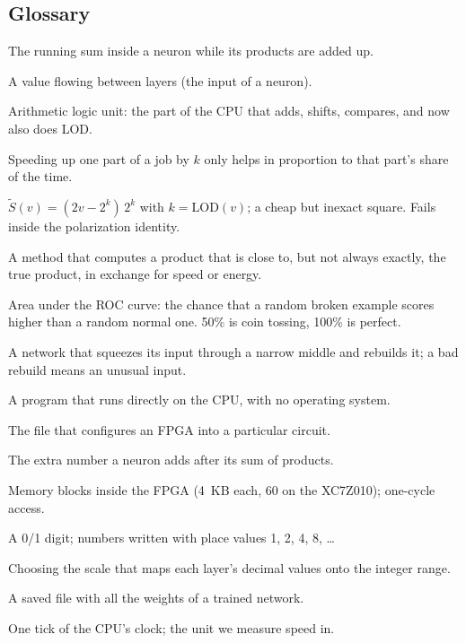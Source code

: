 \subsection{Glossary}

\begin{description}[style=nextline,leftmargin=1.2cm,font=\normalfont\bfseries]
  \item[Accumulator (\code{acc})] The running sum inside a neuron while its products are added up.
  \item[Activation] A value flowing between layers (the input of a neuron).
  \item[ALU] Arithmetic logic unit: the part of the CPU that adds, shifts, compares, and now also does LOD.
  \item[Amdahl's law] Speeding up one part of a job by $k$ only helps in proportion to that part's share of
        the time.
  \item[Approximate square] $\tilde S(v) = (2v - 2^k)\,2^k$ with $k = \mathrm{LOD}(v)$; a cheap but inexact
        square. Fails inside the polarization identity.
  \item[Approximate multiplier] A method that computes a product that is close to, but not always exactly,
        the true product, in exchange for speed or energy.
  \item[AUC] Area under the ROC curve: the chance that a random broken example scores higher than a random
        normal one. 50\% is coin tossing, 100\% is perfect.
  \item[Autoencoder] A network that squeezes its input through a narrow middle and rebuilds it; a bad rebuild
        means an unusual input.
  \item[Bare metal] A program that runs directly on the CPU, with no operating system.
  \item[Bitstream] The file that configures an FPGA into a particular circuit.
  \item[Bias] The extra number a neuron adds after its sum of products.
  \item[Block RAM] Memory blocks inside the FPGA (4~KB each, 60 on the XC7Z010); one-cycle access.
  \item[Bit, binary] A 0/1 digit; numbers written with place values 1, 2, 4, 8, \dots
  \item[Calibration] Choosing the scale that maps each layer's decimal values onto the integer range.
  \item[Checkpoint] A saved file with all the weights of a trained network.
  \item[Clock cycle] One tick of the CPU's clock; the unit we measure speed in.

\end{description}
